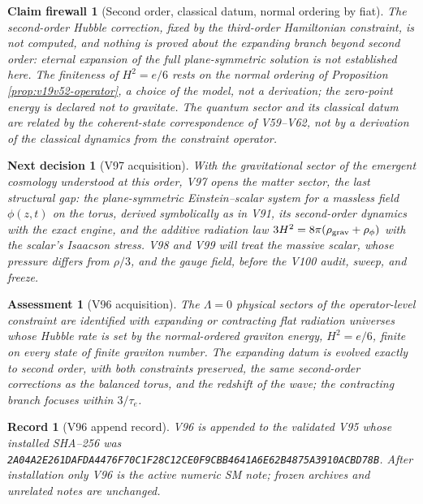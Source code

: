 \documentclass[11pt]{article}
\newtheorem{firewall}[theorem]{Claim firewall}
\newtheorem{decision}[theorem]{Next decision}
\newtheorem{assessment}[theorem]{Assessment}
\newtheorem{record}[theorem]{Record}
\theoremstyle{remark}
\begin{document}
\begin{firewall}[Second order, classical datum, normal ordering by fiat]
\label{fire:v19v96}
The second-order Hubble correction, fixed by the third-order
Hamiltonian constraint, is not computed, and nothing is proved about
the expanding branch beyond second order: eternal expansion of the
full plane-symmetric solution is not established here.  The
finiteness of \(H^2=e/6\) rests on the normal ordering of Proposition
\ref{prop:v19v52-operator}, a choice of the model, not a derivation;
the zero-point energy is declared not to gravitate.  The quantum
sector and its classical datum are related by the coherent-state
correspondence of V59--V62, not by a derivation of the classical
dynamics from the constraint operator.
\end{firewall}

\begin{decision}[V97 acquisition]
\label{dec:v19v96-next}
With the gravitational sector of the emergent cosmology understood
at this order, V97 opens the matter sector, the last structural gap:
the plane-symmetric Einstein--scalar system for a massless field
\(\phi(z,t)\) on the torus, derived symbolically as in V91, its
second-order dynamics with the exact engine, and the additive
radiation law \(3H^2=8\pi(\rho_{\rm grav}+\rho_\phi)\) with the
scalar's Isaacson stress.  V98 and V99 will treat the massive scalar,
whose pressure differs from \(\rho/3\), and the gauge field, before
the V100 audit, sweep, and freeze.
\end{decision}

\begin{assessment}[V96 acquisition]
\label{ass:v19v96}
The \(\Lambda=0\) physical sectors of the operator-level constraint
are identified with expanding or contracting flat radiation
universes whose Hubble rate is set by the normal-ordered graviton
energy, \(H^2=e/6\), finite on every state of finite graviton number.
The expanding datum is evolved exactly to second order, with both
constraints preserved, the same second-order corrections as the
balanced torus, and the redshift of the wave; the contracting branch
focuses within \(3/\tau_e\).
\end{assessment}

\begin{record}[V96 append record]
\label{rec:v19v96}
V96 is appended to the validated V95 whose installed SHA--256 was
\texttt{2A04A2E261DAFDA4476F70C1F28C12CE0F9CBB4641A6E62B4875A3910ACBD78B}.
After installation only V96 is the active numeric SM note; frozen
archives and unrelated notes are unchanged.
\end{record}
\end{document}
